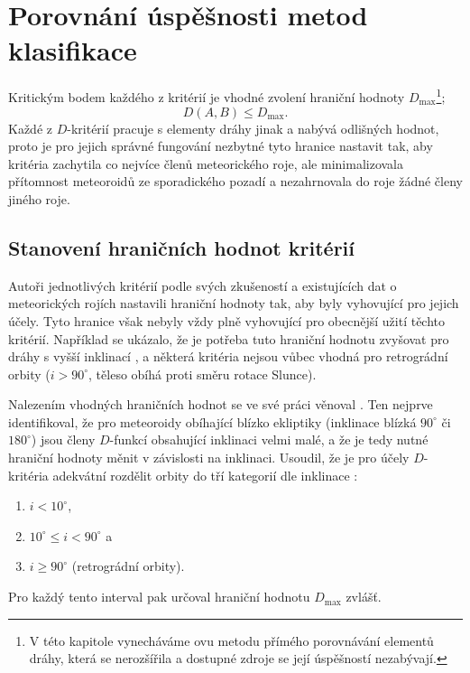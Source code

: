 \chapter{Porovnání úspěšnosti metod klasifikace}%
Kritickým bodem každého z kritérií je vhodné zvolení hraniční hodnoty $D_\text{max}$\footnote{V této kapitole vynecháváme \citeauthor{radiosurvey}ovu metodu přímého porovnávání elementů dráhy, která se nerozšířila a dostupné zdroje se její úspěšností nezabývají.};
$$
    D(A,B)\le D_\text{max}\text{.}
$$
Každé z $D$-kritérií pracuje s elementy dráhy jinak a nabývá odlišných hodnot, proto je pro jejich správné fungování nezbytné tyto hranice nastavit tak, aby kritéria zachytila co nejvíce členů meteorického roje, ale minimalizovala přítomnost meteoroidů ze sporadického pozadí a nezahrnovala do roje žádné členy jiného roje.

\section{Stanovení hraničních hodnot kritérií}%

Autoři jednotlivých kritérií podle svých zkušeností a existujících dat o meteorických rojích nastavili hraniční hodnoty tak, aby byly vyhovující pro jejich účely. Tyto hranice však nebyly vždy plně vyhovující pro obecnější užití těchto kritérií. Například se ukázalo, že je potřeba tuto hraniční hodnotu zvyšovat pro dráhy s vyšší inklinací \cite{galligan}, a některá kritéria nejsou vůbec vhodná pro retrográdní orbity \cite{galligan} ($i>90^\circ$, těleso obíhá proti směru rotace Slunce).

\medskip

Nalezením vhodných hraničních hodnot se ve své práci \cite{galligan} věnoval \citeauthor{galligan}. Ten nejprve identifikoval, že pro meteoroidy obíhající blízko ekliptiky (inklinace blízká $90^\circ$ či $180^\circ$) jsou členy $D$-funkcí obsahující inklinaci velmi malé, a že je tedy nutné hraniční hodnoty měnit v závislosti na inklinaci. Usoudil, že je pro účely $D$-kritéria adekvátní rozdělit orbity do tří kategorií dle inklinace \cite{galligan}:
\begin{enumerate}
    \item \hspace{1cm} $i < 10^\circ$,
    \item \hspace{1cm} $10^\circ \le i < 90^\circ$ a
    \item \hspace{1cm} $i \ge 90^\circ$ (retrográdní orbity).
\end{enumerate}
Pro každý tento interval pak určoval hraniční hodnotu $D_\text{max}$ zvlášť.

